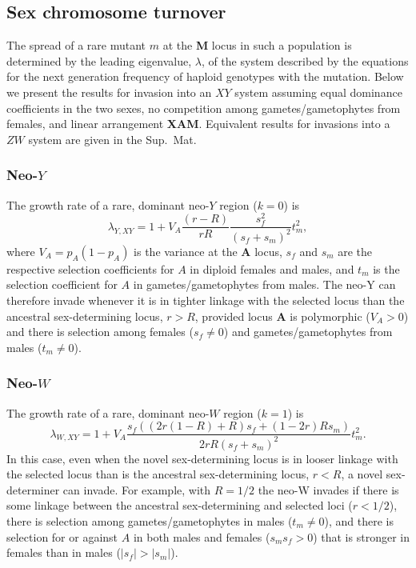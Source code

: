 \documentclass[12pt]{article}
\begin{document}
\subsection*{Sex chromosome turnover}
The spread of a rare mutant $m$ at the \textbf{M} locus in such a population is determined by the leading eigenvalue, $\lambda$, of the system described by the equations for the next generation frequency of haploid genotypes with the mutation. %
Below we present the results for invasion into an $XY$ system assuming equal dominance coefficients in the two sexes, no competition among gametes/gametophytes from females, and linear arrangement \textbf{X}\textbf{A}\textbf{M}.
Equivalent results for invasions into a $ZW$ system are given in the Sup.\ Mat.

\subsubsection*{Neo-$Y$}

The growth rate of a rare, dominant neo-$Y$ region ($k=0$) is
\begin{equation}
\lambda_{Y,XY} = 1 + V_A \frac{(r - R)}{r R} \frac{s_f^2}{\left( s_f + s_m \right)^2} t_m^2,
\end{equation}
where $V_A = p_A(1-p_A)$ is the variance at the \textbf{A} locus, $s_f$ and $s_m$ are the respective selection coefficients for $A$ in diploid females and males, and $t_m$ is the selection coefficient for $A$ in gametes/gametophytes from males.
The neo-Y can therefore invade whenever it is in tighter linkage with the selected locus than the ancestral sex-determining locus, $r>R$, provided locus \textbf{A} is polymorphic ($V_A>0$) and there is selection among females ($s_f\neq0$) and gametes/gametophytes from males ($t_m\neq0$).

\subsubsection*{Neo-$W$}

The growth rate of a rare, dominant neo-$W$ region ($k=1$) is
\begin{equation}
\lambda_{W,XY} = 1 + V_A \frac{s_f \left( (2 r (1-R) +R) s_f + (1- 2r) R s_m \right)}{2 r R \left( s_f + s_m \right)^2} t_m^2.
\end{equation}
In this case, even when the novel sex-determining locus is in looser linkage with the selected locus than is the ancestral sex-determining locus, $r<R$, a novel sex-determiner can invade.
For example, with $R=1/2$ the neo-W invades if there is some linkage between the ancestral sex-determining and selected loci ($r<1/2$), there is selection among gametes/gametophytes in males ($t_m\neq0$), and there is selection for or against $A$ in both males and females ($s_m s_f >0$) that is stronger in females than in males ($|s_f| > |s_m|$).
\end{document}
